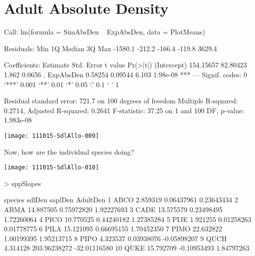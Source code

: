 \documentclass{article}
\begin{document}
\section{Adult Absolute Density}
\begin{Schunk}
\begin{Soutput}
Call:
lm(formula = SimAbsDen ~ ExpAbsDen, data = PlotMeans)

Residuals:
    Min      1Q  Median      3Q     Max 
-1580.1  -212.2  -166.4  -119.8  3629.4 

Coefficients:
             Estimate Std. Error t value Pr(>|t|)    
(Intercept) 154.15657   82.80423   1.862   0.0656 .  
ExpAbsDen     0.58254    0.09544   6.103 1.98e-08 ***
---
Signif. codes:  0 ‘***’ 0.001 ‘**’ 0.01 ‘*’ 0.05 ‘.’ 0.1 ‘ ’ 1

Residual standard error: 721.7 on 100 degrees of freedom
Multiple R-squared:  0.2714,	Adjusted R-squared:  0.2641 
F-statistic: 37.25 on 1 and 100 DF,  p-value: 1.983e-08
\end{Soutput}
\end{Schunk}
\texttt{[image: 111015-SdlAllo-009]}

Now, how are the individual species doing?

\texttt{[image: 111015-SdlAllo-010]}
\begin{Schunk}
\begin{Sinput}
>   sppSlopes
\end{Sinput}
\begin{Soutput}
   species    sdlDen      saplDen     AdultDen
1     ABCO  2.859319   0.06437961   0.23643434
2     ABMA 14.887505   0.75972820   1.92227693
3     CADE 13.575579   0.23498495   1.72260064
4     PICO 10.770525   0.44240182   1.27385284
5     PIJE  1.921255   0.01258263   0.01778775
6     PILA 15.121095   0.66695155   1.70452350
7     PIMO 22.632822   1.00199395   1.95213715
8     PIPO  4.323537   0.03938076  -0.05898207
9     QUCH  4.314128 203.96238272 -32.01116580
10    QUKE 15.792709  -0.10953493   1.84797263
\end{Soutput}
\end{Schunk}




\newpage
\end{document}
